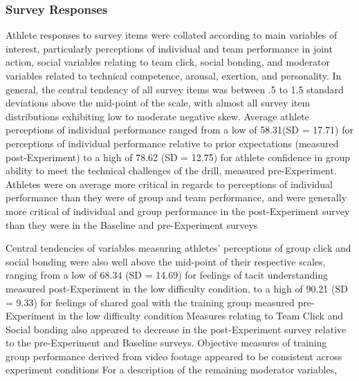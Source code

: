 \subsubsection{Survey Responses}

Athlete responses to survey items were collated according to main variables of interest, particularly perceptions of individual and team performance in joint action, social variables relating to team click, social bonding, and moderator variables related to technical competence, arousal, exertion, and personality. In general, the central tendency of all survey items was between .5 to 1.5 standard deviations above the mid-point of the scale, with almost all survey item distributions exhibiting low to moderate negative skew.  Average athlete perceptions of individual
performance ranged from a low of 58.31(SD = 17.71) for perceptions of individual performance relative to prior expectations (measured post-Experiment) to a high of 78.62 (SD = 12.75) for athlete confidence in group ability to meet the technical challenges of the drill, measured pre-Experiment.  Athletes were on average more critical in regards to perceptions of individual performance than they were of group and team performance, and were generally more critical of individual and group performance in the post-Experiment survey than they were in the Baseline and pre-Experiment surveys


Central tendencies of variables measuring athletes' perceptions of group click and social bonding were also well above the mid-point of their respective scales, ranging from a low of 68.34 (SD = 14.69) for feelings of tacit understanding measured post-Experiment in the low difficulty condition, to a high of 90.21 (SD = 9.33) for feelings of shared goal with the training group measured pre-Experiment in the low difficulty condition
Measures relating to Team Click and Social bonding also appeared to decrease in the post-Experiment survey relative to the pre-Experiment and Baseline surveys.  Objective measures of training group performance derived from video footage appeared to be consistent across experiment conditions
For a description of the remaining moderator variables,



